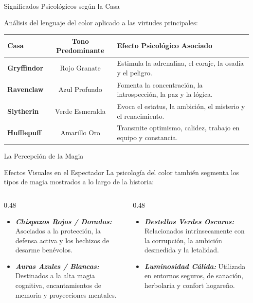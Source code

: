 \documentclass[aspectratio=169]{beamer}
\newcommand{\magia}[1]{\textit{\textbf{\color{burgundy}#1}}}
\begin{document}
\begin{frame}{Significados Psicológicos según la Casa}
   \begin{center}
   \small Análisis del lenguaje del color aplicado a las virtudes principales:
   \vfill
   \begin{tabular}{|l|c|l|}
   \hline
   \rowcolor{charcoal} \color{white}\textbf{Casa} & \color{white}\textbf{Tono Predominante} & \color{white}\textbf{Efecto Psicológico Asociado} \\ \hline
   \textbf{Gryffindor} & Rojo Granate & Estimula la adrenalina, el coraje, la osadía y el peligro. \\ \hline
   \textbf{Ravenclaw}  & Azul Profundo & Fomenta la concentración, la introspección, la paz y la lógica. \\ \hline
   \textbf{Slytherin}  & Verde Esmeralda & Evoca el estatus, la ambición, el misterio y el renacimiento. \\ \hline
   \textbf{Hufflepuff} & Amarillo Oro & Transmite optimismo, calidez, trabajo en equipo y constancia. \\ \hline
   \end{tabular}
   \end{center}
\end{frame}

\begin{frame}{La Percepción de la Magia}
    \begin{block}{Efectos Visuales en el Espectador}
    La psicología del color también segmenta los tipos de magia mostrados a lo largo de la historia:
    \end{block}
    \vfill
    \begin{columns}[T]
        \begin{column}{0.48\linewidth}
            \begin{itemize}
                \item \magia{Chispazos Rojos / Dorados:} Asociados a la protección, la defensa activa y los hechizos de desarme benévolos.
                \item \magia{Auras Azules / Blancas:} Destinados a la alta magia cognitiva, encantamientos de memoria y proyecciones mentales.
            \end{itemize}
        \end{column}
        \begin{column}{0.48\linewidth}
            \begin{itemize}
                \item \magia{Destellos Verdes Oscuros:} Relacionados intrínsecamente con la corrupción, la ambición desmedida y la letalidad.
                \item \magia{Luminosidad Cálida:} Utilizada en entornos seguros, de sanación, herbolaria y confort hogareño.
            \end{itemize}
        \end{column}
    \end{columns}
\end{frame}
\end{document}
